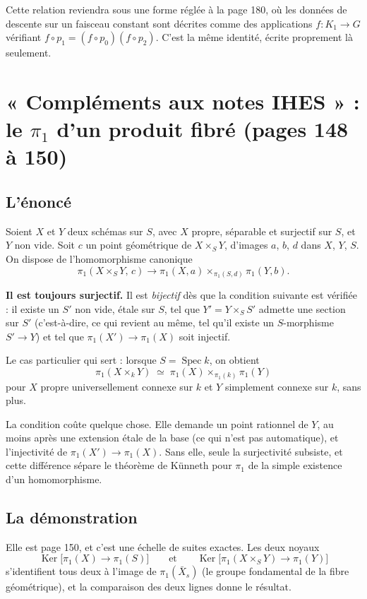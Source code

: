 \documentclass[11pt,a4paper]{article}
\begin{document}
Cette relation reviendra sous une forme réglée à la page 180, où les données de
descente sur un faisceau constant sont décrites comme des applications
$f : K_{1} \to G$ vérifiant $f \circ p_{1} = (f \circ p_{0})(f \circ p_{2})$.
C'est la même identité, écrite proprement là seulement.

\section*{« Compléments aux notes IHES » : le $\pi_{1}$ d'un produit fibré (pages 148 à 150)}

\subsection*{L'énoncé}

Soient $X$ et $Y$ deux schémas sur $S$, avec $X$ propre, séparable et surjectif
sur $S$, et $Y$ non vide. Soit $c$ un point géométrique de $X \times_{S} Y$,
d'images $a$, $b$, $d$ dans $X$, $Y$, $S$. On dispose de l'homomorphisme
canonique
\[
  \pi_{1}(X \times_{S} Y,\, c) \longrightarrow
  \pi_{1}(X, a) \times_{\pi_{1}(S, d)} \pi_{1}(Y, b) .
\]

\textbf{Il est toujours surjectif.} Il est \emph{bijectif} dès que la condition
suivante est vérifiée : il existe un $S'$ non vide, étale sur $S$, tel que
$Y' = Y \times_{S} S'$ admette une section sur $S'$ (c'est-à-dire, ce qui
revient au même, tel qu'il existe un $S$-morphisme $S' \to Y$) et tel que
$\pi_{1}(X') \to \pi_{1}(X)$ soit injectif.

Le cas particulier qui sert : lorsque $S = \operatorname{Spec} k$, on obtient
\[
  \pi_{1}(X \times_{k} Y) \;\simeq\; \pi_{1}(X) \times_{\pi_{1}(k)}
  \pi_{1}(Y)
\]
pour $X$ propre universellement connexe sur $k$ et $Y$ simplement connexe sur
$k$, sans plus.

La condition coûte quelque chose. Elle demande un point rationnel de
$Y$, au moins après une extension étale de la base (ce qui n'est pas
automatique), et l'injectivité de $\pi_{1}(X') \to \pi_{1}(X)$. Sans elle,
seule la surjectivité subsiste, et cette différence
sépare le théorème de Künneth pour $\pi_{1}$ de la simple existence d'un
homomorphisme.

\subsection*{La démonstration}

Elle est page 150, et c'est une échelle de suites exactes. Les deux noyaux
\[
  \operatorname{Ker}\bigl[\pi_{1}(X) \to \pi_{1}(S)\bigr]
  \qquad\text{et}\qquad
  \operatorname{Ker}\bigl[\pi_{1}(X \times_{S} Y) \to \pi_{1}(Y)\bigr]
\]
s'identifient tous deux à l'image de $\pi_{1}(\bar{X}_{s})$ (le groupe
fondamental de la fibre géométrique), et la comparaison des deux lignes donne
le résultat.
\end{document}
